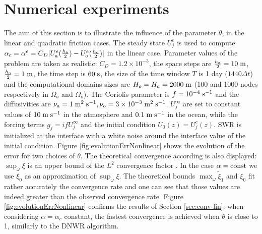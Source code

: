 \section{Numerical experiments}
\label{sec:num-exp}
The aim of this section is to illustrate the influence of the parameter $\theta$, in the linear and quadratic friction cases. 
The steady state $U_j^e$ is used to compute $\alpha_c = \alpha^e = C_D|U_{\rm a}^e(\frac{h_{\rm a}}{2}) - U_{\rm o}^e (\frac{h_{\rm o}}{2})|$ in the linear case.
Parameter values of the problem are taken as realistic:
$C_D = 1.2\times 10^{-3}$, the space steps are
$\frac{h_{\rm a}}{2} = 10\; {\rm m}$, $\frac{h_{\rm o}}{2} = 1 \;{\rm m}$,
the time step  is $60 \;{\rm s}$,
the size of the time window $T$ is 1 day ($1440\Delta t$) and the computational domains sizes are $H_o = H_a = 2000 \; {\rm m}$
(100 and 1000 nodes respectively in $\Omega_a$ and $\Omega_o$).
The Coriolis parameter is 
$f=10^{-4}\; {\rm s^{-1}}$ and the diffusivities are 
$\nu_{\rm a} = 1\; {\rm m^2}\;{\rm s}^{-1}, 
\nu_{\rm o} = 3\times 10^{-3} \;{\rm m^2}\;{\rm s}^{-1}$. 
 $U_j^\infty$
are  set to constant values of $10\;{\rm m}\;{\rm s}^{-1}$ in the 
atmosphere and $0.1\;{\rm m}\;{\rm s}^{-1}$ in the ocean, while the forcing terms 
$g_j=i f U^\infty_j$ and the initial condition $U_0(z)=U_j^e(z)$.
SWR is 
initialized at the interface with a white noise around the interface value
of the initial condition.
Figure \ref{fig:evolutionErrNonlinear} shows the evolution of the error for two choices of $\theta$. The theoretical
convergence according is
also displayed: $\sup_\omega \xi$ is an upper bound of the $L^2$ convergence factor \cite{thery_etude_2021}. In the case
$\alpha={\rm const}$ we use $\xi_0$ as an approximation of
$\sup_\omega \xi$.
The theoretical bounds $\max_\omega \widetilde{\xi}_1$ and $\xi_0$
fit rather accurately the convergence rate and one can see that
those values are indeed greater than the observed convergence rate.
Figure \ref{fig:evolutionErrNonlinear} confirms the results of Section \ref{sec:conv-lin}:
when considering $\alpha=\alpha_c$ constant, the fastest convergence is achieved when $\theta$ is close to 1, similarly to the DNWR algorithm.
